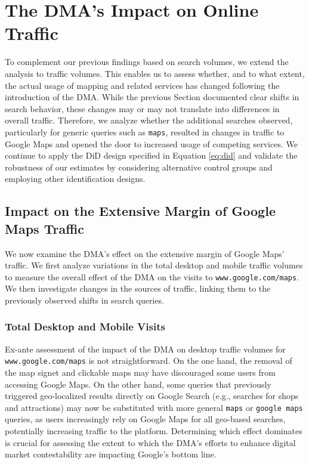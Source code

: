 \documentclass[11pt]{article}
\begin{document}
	\section{The DMA's Impact on Online Traffic}  \label{sec:traffic}
	
	To complement our previous findings based on search volumes, we extend the analysis to traffic volumes. This enables us to assess whether, and to what extent, the actual usage of mapping and related services has changed following the introduction of the DMA. While the previous Section documented clear shifts in search behavior, these changes may or may not translate into differences in overall traffic. Therefore, we analyze whether the additional searches observed, particularly for generic queries such as \texttt{maps}, resulted in changes in traffic to Google Maps and opened the door to increased usage of competing services. We continue to apply the DiD design specified in Equation \ref{eq:did} and validate the robustness of our estimates by considering alternative control groups and employing other identification designs.
	
	
	
	\subsection{Impact on the Extensive Margin of Google Maps Traffic} 
	
	We now examine the DMA's effect on the extensive margin of Google Maps' traffic. We first analyze variations in the total desktop and mobile traffic volumes to measure the overall effect of the DMA on the visits to \texttt{www.google.com/maps}. We then investigate changes in the sources of traffic, linking them to the previously observed shifts in search queries.  
	
	
	
	\subsubsection{Total Desktop and Mobile Visits}\label{subsec:google_maps_desktop_mobile} 
	
	Ex-ante assessment of the impact of the DMA on desktop traffic volumes for \texttt{www.google.com/maps} is not straightforward. On the one hand, the removal of the map signet and clickable maps may have discouraged some users from accessing Google Maps. On the other hand, some queries that previously triggered geo-localized results directly on Google Search (e.g., searches for shops and attractions) may now be substituted with more general \texttt{maps} or \texttt{google maps} queries, as users increasingly rely on Google Maps for all geo-based searches, potentially increasing traffic to the platform. Determining which effect dominates is crucial for assessing the extent to which the DMA's efforts to enhance digital market contestability are impacting Google's bottom line.  
	
\end{document}
